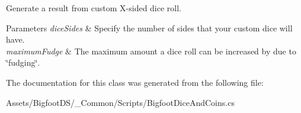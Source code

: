 Generate a result from custom X-\/sided dice roll. 


\begin{DoxyParams}{Parameters}
{\em dice\+Sides} & Specify the number of sides that your custom dice will have.\\
\hline
{\em maximum\+Fudge} & The maximum amount a dice roll can be increased by due to \char`\"{}fudging\char`\"{}.\\
\hline
\end{DoxyParams}


The documentation for this class was generated from the following file\+:\begin{DoxyCompactItemize}
\item 
Assets/\+Bigfoot\+D\+S/\+\_\+\+Common/\+Scripts/Bigfoot\+Dice\+And\+Coins.\+cs\end{DoxyCompactItemize}
